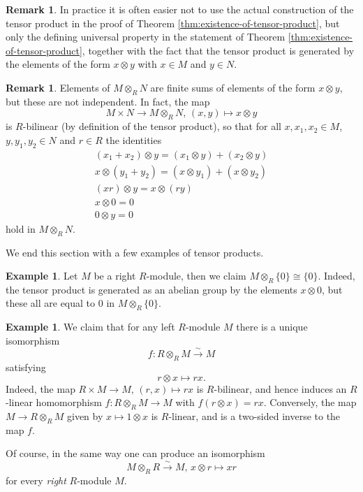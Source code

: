 \documentclass[11pt]{amsbook}
\newcommand{\isomto}{\overset{\sim}{\to}}
\theoremstyle{plain}
\theoremstyle{definition}
\newtheorem{example}[theorem]{Example}
\newtheorem{remark}[theorem]{Remark}
\begin{document}
\begin{remark}
In practice it is often easier not to use the actual construction of the tensor product in the proof of Theorem \ref{thm:existence-of-tensor-product}, but only the defining universal property in the statement of Theorem  \ref{thm:existence-of-tensor-product}, together with the fact that the tensor product is generated by the elements of the form $x\otimes y$ with $x\in M$ and $y\in N$.
\end{remark}

\begin{remark}
Elements of $M\otimes_R N$ are finite sums of elements of the form $x\otimes y$, but these are not independent. In fact, 
the map
\[
	M\times N \to M\otimes_R N,\, (x,y) \mapsto x\otimes y
\]
is $R$-bilinear (by definition of the tensor product), so that for all  $x, x_1,x_2\in M$, $y,y_1,y_2\in N$ and $r\in R$  the identities
\begin{gather*}
	(x_1+x_2) \otimes y = (x_1 \otimes y) + (x_2 \otimes y) \\
	x\otimes (y_1+y_2) = (x \otimes y_1) + (x \otimes y_2) \\
	(xr) \otimes y = x \otimes (ry) \\
	x \otimes 0 = 0 \\
	0 \otimes y = 0 
\end{gather*}
hold in $M\otimes_R N$. 
\end{remark}


We end this section with a few examples of tensor products.

\begin{example}
Let $M$ be a right $R$-module, then we claim $M \otimes_R \{0\} \cong \{0\}$. Indeed, the tensor product is generated as an abelian group by the elements $x\otimes 0$, but these all are equal to $0$ in $M\otimes_R \{0\}$. 
\end{example}


\begin{example}\label{exa:tensor-with-R}
We claim that for any left $R$-module $M$ there is a unique isomorphism 
\[
	f\colon R\otimes_R M \isomto M
\]
satisfying
\[
	r\otimes x \mapsto rx.
\]
Indeed, the map $R\times M \to M,\, (r,x) \mapsto rx$
is $R$-bilinear, and hence induces an $R$-linear homomorphism
$f\colon R\otimes_R M \to M$ with $f(r\otimes x)=rx$. Conversely, the map
$M \to R\otimes_R M$ given by $x \mapsto 1\otimes x$
is $R$-linear, and is a two-sided inverse to the map $f$.

Of course, in the same way one can produce an isomorphism
\[
	 M\otimes_R R \isomto M,\, x \otimes r \mapsto xr
\]
for every \emph{right} $R$-module $M$.
\end{example}
\end{document}
